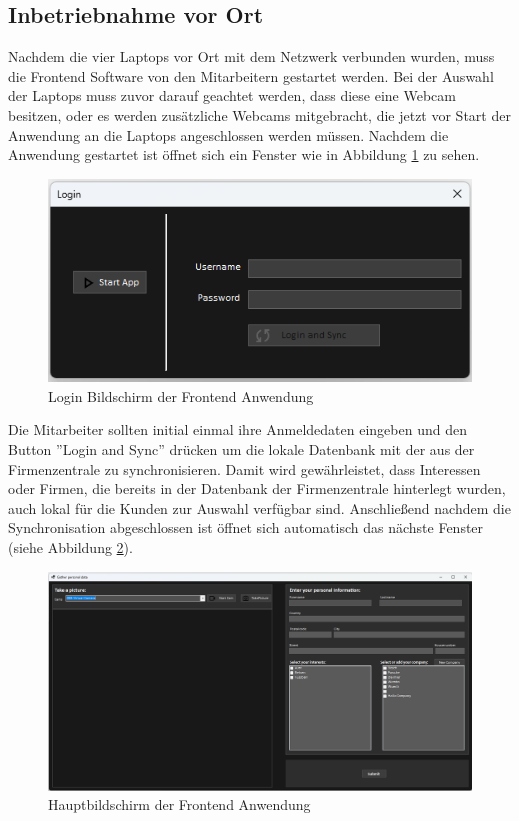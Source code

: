 \newpage
\subsection{Inbetriebnahme vor Ort}
Nachdem die vier Laptops vor Ort mit dem Netzwerk verbunden wurden, muss die Frontend Software von den Mitarbeitern gestartet werden. Bei der Auswahl der Laptops muss zuvor darauf geachtet werden, dass diese eine Webcam besitzen, oder es werden zusätzliche Webcams mitgebracht, die jetzt vor Start der Anwendung an die Laptops angeschlossen werden müssen. Nachdem die Anwendung gestartet ist öffnet sich ein Fenster wie in Abbildung \ref{fig:projektmesseloginscreen} zu sehen.

\begin{figure}[h]
	\centering
	\includegraphics[width=0.7\linewidth]{Images/LoginScreen}
	\caption{Login Bildschirm der Frontend Anwendung}
	\label{fig:projektmesseloginscreen}
\end{figure}

Die Mitarbeiter sollten initial einmal ihre Anmeldedaten eingeben und den Button ''Login and Sync'' drücken um die lokale Datenbank mit der aus der Firmenzentrale zu synchronisieren. Damit wird gewährleistet, dass Interessen oder Firmen, die bereits in der Datenbank der Firmenzentrale hinterlegt wurden, auch lokal für die Kunden zur Auswahl verfügbar sind. Anschließend nachdem die Synchronisation abgeschlossen ist öffnet sich automatisch das nächste Fenster (siehe Abbildung \ref{fig:projektmessemainscreen}).

\begin{figure}[h]
	\centering
	\includegraphics[width=0.9\linewidth]{Images/Hauptbildschirm}
	\caption{Hauptbildschirm der Frontend Anwendung}
	\label{fig:projektmessemainscreen}
\end{figure}

